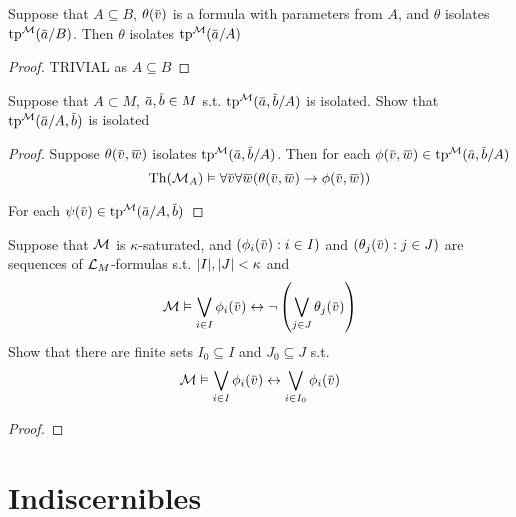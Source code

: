 \documentclass[11pt]{article}
\begin{document}
\begin{exercise}
\label{ex4.5.10}
Suppose that \(A\subseteq B\), \(\theta(\barv)\) is a formula with parameters from \(A\), and \(\theta\)
isolates \(\tp^{\calm}(\bara/B)\). Then \(\theta\) isolates \(\tp^{\calm}(\bara/A)\)
\end{exercise}

\begin{proof}
TRIVIAL as \(A\subseteq B\)
\end{proof}

\begin{exercise}
\label{ex4.5.11}
Suppose that \(A\subset M\), \(\bara,\barb\in M\) s.t. \(\tp^{\calm}(\bara,\barb/A)\) is isolated. Show
that \(\tp^{\calm}(\bara/A,\barb)\) is isolated
\end{exercise}

\begin{proof}
Suppose \(\theta(\barv,\barw)\) isolates \(\tp^{\calm}(\bara,\barb/A)\). Then for each \(\phi(\barv,\barw)\in\tp^{\calm}(\bara,\barb/A)\)
\begin{equation*}
\Th(\calm_A)\vDash\forall\barv\forall\barw(\theta(\barv,\barw)\to\phi(\barv,\barw))
\end{equation*}

For each \(\psi(\barv)\in\tp^{\calm}(\bara/A,\barb)\)
\end{proof}

\begin{exercise}
\label{ex4.5.34}
Suppose that \(\mathcal{M}\) is \(\kappa\)-saturated, and \((\phi_i(\barv):i\in I)\) and \((\theta_j(\barv):j\in J)\) are
sequences of \(\mathcal{L}_M\)-formulas s.t. \(\abs{I},\abs{J}<\kappa\) and
\begin{equation*}
\calm\vDash\bigvee_{i\in I}\phi_i(\barv)\leftrightarrow\neg\left( \bigvee_{j\in J}\theta_j(\barv) \right)
\end{equation*}
Show that there are finite sets \(I_0\subseteq I\) and \(J_0\subseteq J\) s.t.
\begin{equation*}
\calm\vDash\bigvee_{i\in I}\phi_i(\barv)\leftrightarrow\bigvee_{i\in I_0}\phi_i(\barv)
\end{equation*}
\end{exercise}

\begin{proof}

\end{proof}

\section{Indiscernibles}
\label{sec:org4e46fad}
\end{document}
